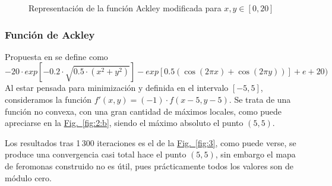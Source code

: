 \documentclass[runningheads]{llncs}
\newcommand{\refcruzada}[2]{\hyperref[#2]{#1~\ref{#2}}}
\begin{document}
    \begin{figure}[htbp]
        \centering
        \caption{Representación de la función Ackley modificada para $x,y\in[0,20]$}
    \end{figure}

    \subsubsection{Función de Ackley} Propuesta en \cite{AckleyFunction} se define como
    \[-20 \cdot exp[-0.2 \cdot \sqrt{0.5 \cdot (x^2 + y^2)}] - exp[0.5 ( \cos(2 \pi x)
    + \cos(2 \pi y))] + e + 20)\]
    Al estar pensada para minimización y definida en el intervalo $[-5,5]$, consideramos la función $f'(x,y)=(-1)\cdot f(x-5, y-5)$. Se trata de una función no convexa, con una gran cantidad de máximos locales, como puede apreciarse en la \refcruzada{Fig.}{fig:2:b}, siendo el máximo absoluto el punto $(5,5)$.
    
    Los resultados tras 1\,300 iteraciones es el de la \refcruzada{Fig.}{fig:3}, como puede verse, se produce una convergencia casi total hace el punto $(5,5)$, sin embargo el mapa de feromonas construido no es útil, pues prácticamente todos los valores son de módulo cero.
\end{document}
